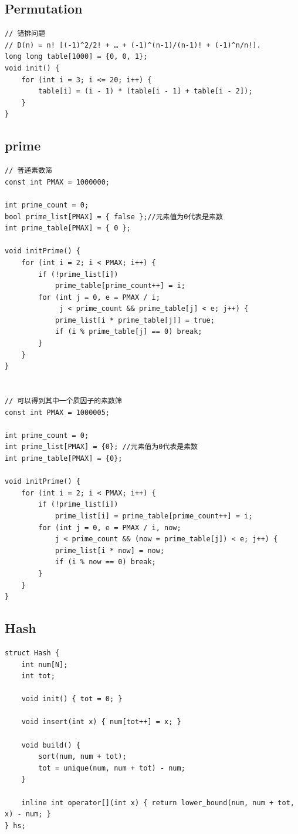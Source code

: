 \documentclass[twoside]{article}
\begin{document}
\subsection{Permutation}
\begin{lstlisting}
// 错排问题
// D(n) = n! [(-1)^2/2! + … + (-1)^(n-1)/(n-1)! + (-1)^n/n!].
long long table[1000] = {0, 0, 1};
void init() {
    for (int i = 3; i <= 20; i++) {
        table[i] = (i - 1) * (table[i - 1] + table[i - 2]);
    }
}\end{lstlisting}
\subsection{prime}
\begin{lstlisting}
// 普通素数筛
const int PMAX = 1000000;

int prime_count = 0;
bool prime_list[PMAX] = { false };//元素值为0代表是素数
int prime_table[PMAX] = { 0 };

void initPrime() {
    for (int i = 2; i < PMAX; i++) {
        if (!prime_list[i])
            prime_table[prime_count++] = i;
        for (int j = 0, e = PMAX / i;
             j < prime_count && prime_table[j] < e; j++) {
            prime_list[i * prime_table[j]] = true;
            if (i % prime_table[j] == 0) break;
        }
    }
}


// 可以得到其中一个质因子的素数筛
const int PMAX = 1000005;

int prime_count = 0;
int prime_list[PMAX] = {0}; //元素值为0代表是素数
int prime_table[PMAX] = {0};

void initPrime() {
    for (int i = 2; i < PMAX; i++) {
        if (!prime_list[i])
            prime_list[i] = prime_table[prime_count++] = i;
        for (int j = 0, e = PMAX / i, now; 
        	j < prime_count && (now = prime_table[j]) < e; j++) {
            prime_list[i * now] = now;
            if (i % now == 0) break;
        }
    }
}\end{lstlisting}
\subsection{Hash}
\begin{lstlisting}
struct Hash {
    int num[N];
    int tot;

    void init() { tot = 0; }

    void insert(int x) { num[tot++] = x; }

    void build() {
        sort(num, num + tot);
        tot = unique(num, num + tot) - num;
    }

    inline int operator[](int x) { return lower_bound(num, num + tot, x) - num; }
} hs;\end{lstlisting}
\end{document}
